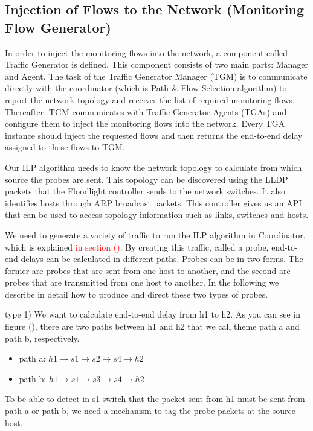 \documentclass[10pt, journal, letterpaper]{IEEEtran}
\begin{document}
\subsection{Injection of Flows to the Network (Monitoring Flow Generator)}
In order to inject the monitoring flows into the network, a component called Traffic Generator is defined. This component consists of two main parts: Manager and Agent. The task of the Traffic Generator Manager (TGM) is to communicate directly with the coordinator (which is Path $\&$ Flow Selection algorithm) to report the network topology and receives the list of required monitoring flows. Thereafter, TGM communicates with Traffic Generator Agents (TGAs) and configure them to inject the monitoring flows into the network. Every TGA instance should inject the requested flows and then returns the end-to-end delay assigned to those flows to TGM. 



Our ILP algorithm needs to know the network topology to calculate from which source the probes are sent. This topology can be discovered using the LLDP packets that the Floodlight controller sends to the network switches. It also identifies hosts through ARP broadcast packets. This controller gives us an API that can be used to access topology information such as links, switches and hosts.

We need to generate a variety of traffic to run the ILP algorithm in Coordinator, which is explained \textcolor{red}{in section ()}. By creating this traffic, called a probe, end-to-end delays can be calculated in different paths. Probes can be in two forms. The former are probes that are sent from one host to another, and the second are probes that are transmitted from one host to another. In the following we describe in detail how to produce and direct these two types of probes.

type 1) We want to calculate end-to-end delay from h1 to h2. As you can see in figure (), there are two paths between h1 and h2 that we call theme path a and path b, respectively.
\begin{itemize}
    \item path a: $h1\rightarrow s1\rightarrow s2\rightarrow s4\rightarrow h2$
    \item path b: $h1\rightarrow s1\rightarrow s3\rightarrow s4\rightarrow h2$
\end{itemize}

To be able to detect in s1 switch that the packet sent from h1 must be sent from path a or path b, we need a mechanism to tag the probe packets at the source host.
\end{document}
